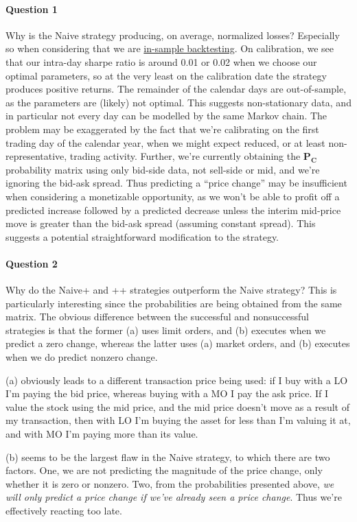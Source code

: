 \documentclass[12pt]{article}
\newcommand\mat[1]{\boldsymbol{#1}}
\begin{document}
\paragraph{Question 1} Why is the Naive strategy producing, on average, normalized losses? Especially so when considering that we are \underline{in-sample backtesting}. On calibration, we see that our intra-day sharpe ratio is around 0.01 or 0.02 when we choose our optimal parameters, so at the very least on the calibration date the strategy produces positive returns. The remainder of the calendar days are out-of-sample, as the parameters are (likely) not optimal. This suggests non-stationary data, and in particular not every day can be modelled by the same Markov chain. The problem may be exaggerated by the fact that we're calibrating on the first trading day of the calendar year, when we might expect reduced, or at least non-representative, trading activity. Further, we're currently obtaining the $\mat{P_C}$ probability matrix using only bid-side data, not sell-side or mid, and we're ignoring the bid-ask spread. Thus predicting a ``price change'' may be insufficient when considering a monetizable opportunity, as we won't be able to profit off a predicted increase followed by a predicted decrease unless the interim mid-price move is greater than the bid-ask spread (assuming constant spread). This suggests a potential straightforward modification to the strategy.

\paragraph{Question 2} Why do the Naive+ and ++ strategies outperform the Naive strategy? This is particularly interesting since the probabilities are being obtained from the same matrix. The obvious difference between the successful and nonsuccessful strategies is that the former (a) uses limit orders, and (b) executes when we predict a zero change, whereas the latter uses (a) market orders, and (b) executes when we do predict nonzero change.

(a) obviously leads to a different transaction price being used: if I buy with a LO I'm paying the bid price, whereas buying with a MO I pay the ask price. If I value the stock using the mid price, and the mid price doesn't move as a result of my transaction, then with LO I'm buying the asset for less than I'm valuing it at, and with MO I'm paying more than its value.

(b) seems to be the largest flaw in the Naive strategy, to which there are two factors. One, we are not predicting the magnitude of the price change, only whether it is zero or nonzero. Two, from the probabilities presented above, \textit{we will only predict a price change if we've already seen a price change}. Thus we're effectively reacting too late. 
\end{document}
